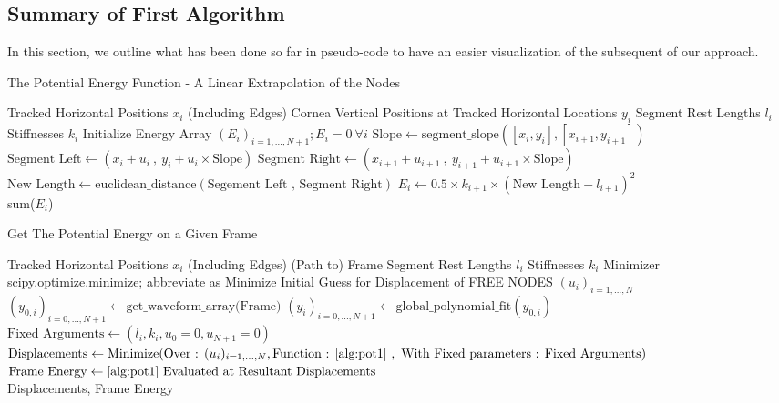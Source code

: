 \documentclass[epjST]{svjour}
\begin{document}
\subsection{Summary of First Algorithm}
\label{algos1}
In this section, we outline what has been done so far in pseudo-code to have an easier visualization of the subsequent of our approach.
\begin{algorithm}
    \caption{The Potential Energy Function - A Linear Extrapolation of the Nodes}
    \label{alg:pot1}
    \begin{algorithmic}[1]
        \Require Tracked Horizontal Positions $x_i$ (Including Edges)
        \Require Cornea Vertical Positions at Tracked Horizontal Locations $y_i$
        \Require Segment Rest Lengths $l_i$
        \Require Stiffnesses $k_i$
        \State Initialize Energy Array $(E_i)_{i=1,...,N+1}; E_i = 0\:\forall i$
        \State $\text{Slope}\gets \text{segment\_slope}([x_i,y_i],[x_{i+1},y_{i+1}])$
        \State $\text{Segment Left}\gets (x_{i}+u_{i}\:,\: y_i + u_i \times \text{Slope})$
        \State $\text{Segment Right}\gets (x_{i+1}+u_{i+1}\:,\: y_{i+1} + u_{i+1} \times \text{Slope})$
        \State $\text{New Length}\gets \text{euclidean\_distance}(\text{Segement Left , Segment Right})$
        \State $E_i\gets 0.5\times k_{i+1} \times (\text{New Length} - l_{i+1})^2$
        \EndFor\\
        \Return sum($E_i$)
    \end{algorithmic}
\end{algorithm}
\begin{algorithm}
    \caption{Get The Potential Energy on a Given Frame}
    \label{alg:frampot1}
    \begin{algorithmic}[1]
        \Require Tracked Horizontal Positions $x_i$ (Including Edges)
        \Require (Path to) Frame
        \Require Segment Rest Lengths $l_i$
        \Require Stiffnesses $k_i$
        \Require Minimizer scipy.optimize.minimize; abbreviate as Minimize
        \Require Initial Guess for Displacement of FREE NODES $(u_i)_{i=1,...,N}$
        \State $(y_{0,i})_{i=0,...,N+1} \gets \text{get\_waveform\_array(Frame)}$
        \State $(y_i)_{i=0,...,N+1} \gets \text{global\_polynomial\_fit}(y_{0,i})$
        \State $\text{Fixed Arguments}\gets (l_i, k_i, u_0=0, u_{N+1}=0)$
        \State $\text{Displacements} \gets \text{Minimize}(\text{Over : }(u_i)_{i=1,...,N},\text{Function : \autoref{alg:pot1} }, \text{ With Fixed parameters : Fixed Arguments})$
        \State $\text{Frame Energy}\gets \text{\autoref{alg:pot1}} \text{ Evaluated at Resultant Displacements}$
        \\\Return Displacements, Frame Energy
        
    \end{algorithmic}
\end{algorithm}
\end{document}
